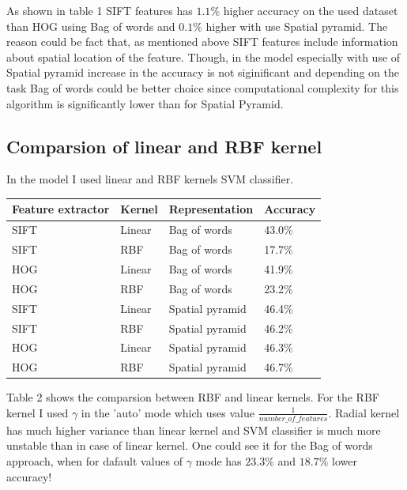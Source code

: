 As shown in table 1 SIFT features has $1.1\%$ higher accuracy on the used dataset than HOG using Bag of words and $0.1\%$ higher with use Spatial pyramid. The reason could be fact that, as mentioned above SIFT features include information about spatial location of the feature. Though, in the model especially with use of Spatial pyramid increase in the accuracy is not siginificant and depending on the task Bag of words could be better choice since computational complexity for this algorithm is significantly lower than for Spatial Pyramid.

    \subsection*{Comparsion of linear and RBF kernel}
In the model I used linear and RBF kernels SVM classifier.\\
    
\begin{tabular}{ |p{3cm}||p{3cm}|p{3cm}|p{3cm}|  }

 \hline
 Feature extractor & Kernel & Representation & Accuracy\\
 \hline \hline
 SIFT   & Linear & Bag of words & 43.0\%\\ \hline
 SIFT   & RBF & Bag of words & 17.7\%\\ \hline \hline
 HOG &   Linear  & Bag of words & 41.9\%\\ \hline
 HOG &   RBF  & Bag of words & 23.2\%\\ \hline \hline
 SIFT   & Linear & Spatial pyramid & 46.4\%\\ \hline
 SIFT   & RBF & Spatial pyramid & 46.2\%\\ \hline \hline
 HOG &   Linear  & Spatial pyramid & 46.3\%\\ \hline
 HOG &   RBF  & Spatial pyramid & 46.7\%\\ 
 \hline
\end{tabular}

\hfill \break 
Table 2 shows the comparsion between RBF and linear kernels. For the RBF kernel I used $\gamma$ in the 'auto' mode which uses value $\frac{1}{number\_of\_features}$. Radial kernel has much higher variance than linear kernel and SVM classifier is much more unstable than in case of linear kernel. One could see it for the Bag of words approach, when for dafault values of $\gamma$ mode has $23.3\%$ and $18.7\%$ lower accuracy!

